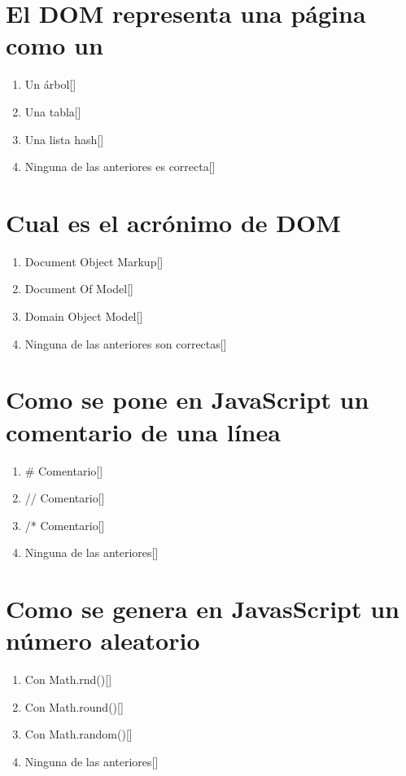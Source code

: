 \documentclass[addpoints, 12]{exam}{article}
\begin{document}
\section{El DOM representa una página como un}
\label{sec:org3306d77}
\begin{enumerate}
\item Un árbol[]
\item Una tabla[]
\item Una lista hash[]
\item Ninguna de las anteriores es correcta[]
\end{enumerate}

\section{Cual es el acrónimo de DOM}
\label{sec:org5fb67d2}
\begin{enumerate}
\item Document Object Markup[]
\item Document Of Model[]
\item Domain Object Model[]
\item Ninguna de las anteriores son correctas[]
\end{enumerate}

\section{Como se pone en JavaScript un comentario de una línea}
\label{sec:orgff7aa9e}
\begin{enumerate}
\item \# Comentario[]
\item // Comentario[]
\item /* Comentario[]
\item Ninguna de las anteriores[]
\end{enumerate}

\section{Como se genera en JavasScript un número aleatorio}
\label{sec:org267684c}
\begin{enumerate}
\item Con Math.rnd()[]
\item Con Math.round()[]
\item Con Math.random()[]
\item Ninguna de las anteriores[]
\end{enumerate}
\end{document}
